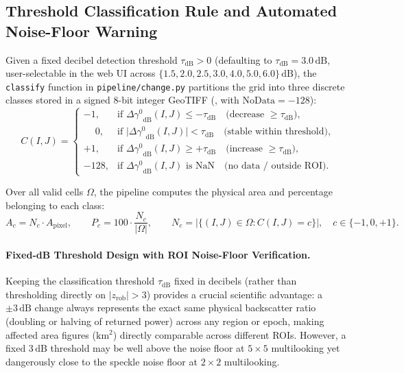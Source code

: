 \documentclass[11pt,a4paper]{article}
\newcommand{\src}[1]{\nolinkurl{#1}}
\newcommand{\unit}[1]{\mathrm{#1}}
\newcommand{\gz}{\ensuremath{\gamma^{0}}}
\begin{document}
\subsection{Threshold Classification Rule and Automated Noise-Floor Warning}
\label{subsec:cambio-clasificacion-ruido}

Given a fixed decibel detection threshold $\tau_{\mathrm{dB}} > 0$ (defaulting to $\tau_{\mathrm{dB}} = 3.0\,\unit{dB}$, user-selectable in the web UI across $\{1.5, 2.0, 2.5, 3.0, 4.0, 5.0, 6.0\}\,\unit{dB}$), the \texttt{classify} function in \src{pipeline/change.py} partitions the grid into three discrete classes stored in a signed 8-bit integer GeoTIFF (, with $\text{NoData} = -128$):
\begin{equation}
  C(I,J) =
  \begin{cases}
    -1, & \text{if } \Delta\gz_{\mathrm{dB}}(I,J) \le -\tau_{\mathrm{dB}} \quad\text{(decrease $\ge \tau_{\mathrm{dB}}$)}, \\[4pt]
    \phantom{-}0, & \text{if } \bigl|\Delta\gz_{\mathrm{dB}}(I,J)\bigr| < \tau_{\mathrm{dB}} \quad\text{(stable within threshold)}, \\[4pt]
    +1, & \text{if } \Delta\gz_{\mathrm{dB}}(I,J) \ge +\tau_{\mathrm{dB}} \quad\text{(increase $\ge \tau_{\mathrm{dB}}$)}, \\[4pt]
    -128, & \text{if } \Delta\gz_{\mathrm{dB}}(I,J) \text{ is } \mathrm{NaN} \quad\text{(no data / outside ROI)}.
  \end{cases}
  \label{eq:cambio-clases}
\end{equation}

Over all valid cells $\Omega$, the pipeline computes the physical area and percentage belonging to each class:
\begin{equation}
  A_{c} = N_{c} \cdot A_{\mathrm{pixel}}, \qquad
  P_{c} = 100 \cdot \frac{N_{c}}{|\Omega|}, \qquad
  N_{c} = \bigl|\{(I,J)\in\Omega : C(I,J) = c\}\bigr|, \quad c \in \{-1, 0, +1\}.
  \label{eq:cambio-areas}
\end{equation}

\paragraph{Fixed-dB Threshold Design with ROI Noise-Floor Verification.}
Keeping the classification threshold $\tau_{\mathrm{dB}}$ fixed in decibels (rather than thresholding directly on $|z_{\mathrm{rob}}| > 3$) provides a crucial scientific advantage: a $\pm 3\,\unit{dB}$ change always represents the exact same physical backscatter ratio (doubling or halving of returned power) across any region or epoch, making affected area figures ($\unit{km^2}$) directly comparable across different ROIs. However, a fixed $3\,\unit{dB}$ threshold may be well above the noise floor at $5\times 5$ multilooking yet dangerously close to the speckle noise floor at $2\times 2$ multilooking.
\end{document}
